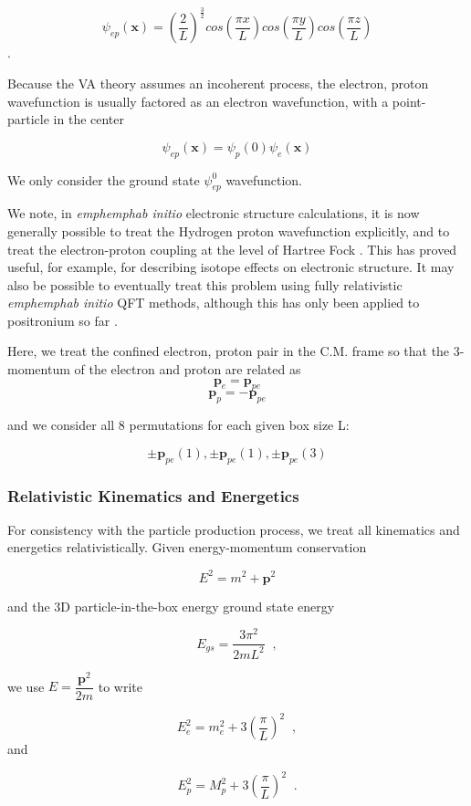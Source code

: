 \documentclass[%
 aip,
 jmp,%
 amsmath,amssymb,
 reprint,%
]{revtex4-1}
\begin{document}
$$\psi_{ep}(\mathbf{x})=\left(\dfrac{2}{L}\right)^{\frac{3}{2}}cos\left(\dfrac{\pi x}{L}\right)cos\left(\dfrac{\pi y}{L}\right)cos\left(\dfrac{\pi z}{L}\right)$$.

Because the VA theory assumes an incoherent process, the electron, proton wavefunction is usually factored as an electron wavefunction, with a point-particle in the center

$$\psi_{ep}(\mathbf{x})=\psi_{p}(0)\psi_{e}(\mathbf{x})$$

We only consider the ground state $\psi_{ep}^{0}$ wavefunction.

We note, in \emph{emph{emph{ab initio}}} electronic structure calculations, it is now generally possible to treat the Hydrogen proton wavefunction explicitly, and to treat the electron-proton coupling at the level of Hartree Fock \cite{martin}.  This has proved useful, for example, for describing isotope effects on electronic structure.  It may also be possible to eventually treat this problem using fully relativistic \emph{emph{emph{ab initio}}} QFT methods, although this has only been applied to positronium so far \cite{positroniumQFT}.

Here, we treat the confined electron, proton pair in the C.M. frame so that the 3-momentum of the electron and proton are related as
$$\mathbf{p}_{e}=\mathbf{p}_{pe}$$
$$\mathbf{p}_{p}=-\mathbf{p}_{pe}$$

and we consider all 8 permutations for each given box size L:

$$\pm\mathbf{p}_{pe}(1), \pm\mathbf{p}_{pe}(1), \pm\mathbf{p}_{pe}(3)$$

\subsubsection{Relativistic Kinematics and Energetics}
For consistency with the particle production process, we treat all kinematics and energetics relativistically.  Given energy-momentum conservation

$$E^{2}=m^{2}+\mathbf{p}^{2}$$

and the 3D particle-in-the-box energy ground state energy 

$$E_{gs}=\dfrac{3\pi^{2}}{2mL^{2}}\;\;,$$

we use $E=\dfrac{\mathbf{p}^{2}}{2m}$ to write

$$E^{2}_{e}=m^{2}_{e}+3\left(\dfrac{\pi}{L}\right)^{2}\;\;,$$ and

$$E^{2}_{p}=M^{2}_{p}+3\left(\dfrac{\pi}{L}\right)^{2}\;\;.$$
\end{document}
